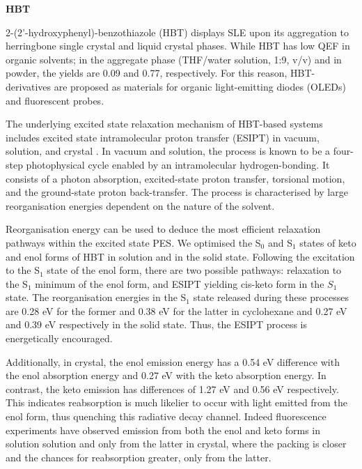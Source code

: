 \textbf{HBT}

2-(2'-hydroxyphenyl)-benzothiazole (HBT) displays SLE upon its aggregation to herringbone single crystal\cite{hbt_derivatives1} and liquid crystal phases.\cite{hbt_lc} While HBT has low QEF in organic solvents;\cite{hbt_exp,hbt_solvents} in the aggregate phase (THF/water solution, 1:9, v/v) and in powder, the yields are 0.09 and 0.77, respectively.\cite{hbt_exp} For this reason, HBT-derivatives are proposed as materials for organic light-emitting diodes (OLEDs) and fluorescent probes.

The underlying excited state relaxation mechanism of HBT-based systems includes excited state intramolecular proton transfer (ESIPT) in vacuum, solution,\cite{Mario_HBT, HBT_multiplespawning} and crystal \cite{hbt_esipt0,hbt_esipt}. In vacuum and solution, the process is known to be a four-step photophysical cycle enabled by an intramolecular hydrogen-bonding. It consists of a photon absorption, excited-state proton transfer, torsional motion, and the ground-state proton back-transfer\cite{Mario_HBT,hbt_esipt}. The process is characterised by large reorganisation energies dependent on the nature of the solvent.\cite{Mario_HBT,hbt_esipt}

Reorganisation energy can be used to deduce the most efficient relaxation pathways within the excited state PES. We optimised the S$_0$ and S$_1$ states of keto and enol forms of HBT in solution and in the solid state. Following the excitation to the S$_1$ state of the enol form, there are two possible pathways: relaxation to the S$_1$ minimum of the enol form, and ESIPT yielding cis-keto form in the $S_1$ state. The reorganisation energies in the S$_1$ state released during these processes are 0.28 eV for the former and 0.38 eV for the latter in cyclohexane and 0.27 eV and 0.39 eV respectively in the solid state. Thus, the ESIPT process is energetically encouraged.

Additionally, in crystal, the enol emission energy has a 0.54 eV difference with the enol absorption energy and 0.27 eV with the keto absorption energy. In contrast, the keto emission has differences of 1.27 eV and 0.56 eV respectively. This indicates reabsorption is much likelier to occur with light emitted from the enol form, thus quenching this radiative decay channel. Indeed fluorescence experiments have observed emission from both the enol and keto forms in solution solution\cite{hbt_esipt2} and only from the latter in crystal,\cite{HBT_laser} where the packing is closer and the chances for reabsorption greater, only from the latter.

